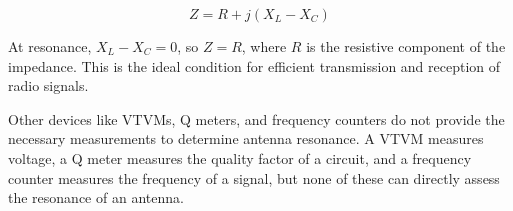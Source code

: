 \[
Z = R + j(X_L - X_C)
\]

At resonance, \(X_L - X_C = 0\), so \(Z = R\), where \(R\) is the resistive component of the impedance. This is the ideal condition for efficient transmission and reception of radio signals.

Other devices like VTVMs, Q meters, and frequency counters do not provide the necessary measurements to determine antenna resonance. A VTVM measures voltage, a Q meter measures the quality factor of a circuit, and a frequency counter measures the frequency of a signal, but none of these can directly assess the resonance of an antenna.

